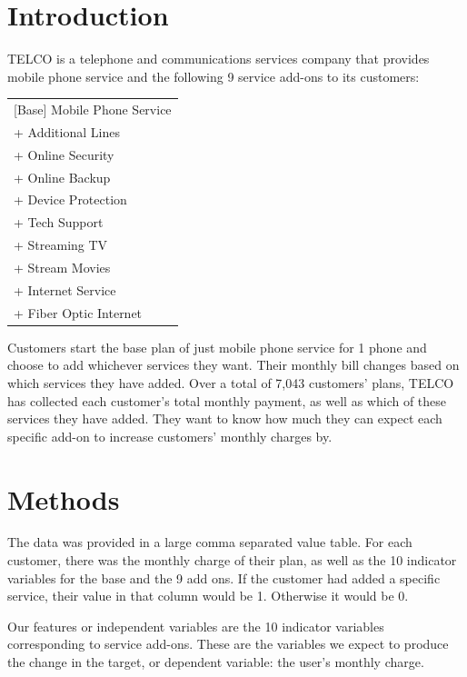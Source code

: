 \documentclass[12pt, letterpaper]{article}
\begin{document}
\section{Introduction}

TELCO is a telephone and communications services company that provides mobile phone service and the following 9 service add-ons to its customers:

\begin{table}[h]
\begin{tabular}{l}
[Base] Mobile Phone Service \\
+ Additional Lines     \\
+ Online Security      \\
+ Online Backup        \\
+ Device Protection    \\
+ Tech Support         \\
+ Streaming TV         \\
+ Stream Movies        \\
+ Internet Service     \\
+ Fiber Optic Internet
\end{tabular}
\end{table}


Customers start the base plan of just mobile phone service for 1 phone and choose to add whichever services they want. Their monthly bill changes based on which services they have added. 
	 Over a total of 7,043 customers' plans, TELCO has collected each customer's total monthly payment, as well as which of these services they have added. They want to know how much they can expect each specific add-on to increase customers' monthly charges by.
	 

\section {Methods}

The data was provided in a large comma separated value table. For each customer, there was the monthly charge of their plan, as well as the 10 indicator variables for the base and the 9 add ons. If the customer had added a specific service, their value in that column would be 1. Otherwise it would be 0.

Our features or independent variables are the 10 indicator variables corresponding to service add-ons. These are the variables we expect to produce the change in the target, or dependent variable: the user's monthly charge.
\end{document}
